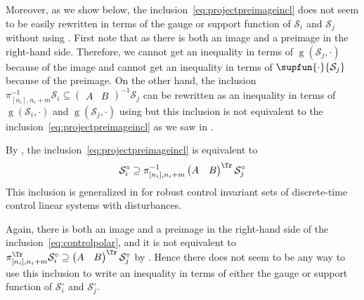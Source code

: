 \documentclass[11pt,twoside,a4paper,openright]{uclouvain-thesis}
\DeclareMathOperator{\gauge}{g}
\begin{document}
Moreover, as we show below, the inclusion~\eqref{eq:projectpreimageincl} does not
seem to be easily rewritten in terms of the gauge or support function of
$\mathcal{S}_i$ and $\mathcal{S}_j$ without using .
First note that as there is both an image and a preimage in the right-hand side.
Therefore, we cannot get an inequality in terms of $\gauge(\mathcal{S}_j, \cdot)$ because
of the image and cannot get an inequality in terms of $\supfun{\cdot}{\mathcal{S}_j}$ because of the preimage.
On the other hand, the inclusion \(
  \pi_{[n_i], n_i + m}^{-1}
  \mathcal{S}_i \subseteq
  \begin{pmatrix}
    A & B
  \end{pmatrix}^{-1}
  \mathcal{S}_j
\)
can be rewritten as an inequality in terms of $\gauge(\mathcal{S}_i, \cdot)$ and $\gauge(\mathcal{S}_j, \cdot)$ using 
but this inclusion is not equivalent to the inclusion~\eqref{eq:projectpreimageincl} as we saw
in .

By , the inclusion~\eqref{eq:projectpreimageincl} is equivalent to
\begin{equation}
  \label{eq:controlpolar}
  \mathcal{S}_i^\circ \supseteq
  \pi_{[n_i], n_i + m}^{-1}
  \begin{pmatrix}
    A & B
  \end{pmatrix}^{\Tr}
  \mathcal{S}_j^\circ
\end{equation}
This inclusion is generalized in \cite{rakovic2020robust} for robust control invariant sets of discrete-time control linear systems with disturbances.

Again, there is both an image and a preimage in the right-hand side of the inclusion~\eqref{eq:controlpolar},
and it is not equivalent to
\(
  \pi_{[n_i], n_i + m}^{\Tr}
  \mathcal{S}_i^\circ \supseteq
  \begin{pmatrix}
    A & B
  \end{pmatrix}^{\Tr}
  \mathcal{S}_j^\circ
\)
by .
Hence there does not seem to be any way to use this inclusion
to write an inequality in terms of either the gauge or support function
of $\mathcal{S}_i^\circ$ and $\mathcal{S}_j^\circ$.
\end{document}
